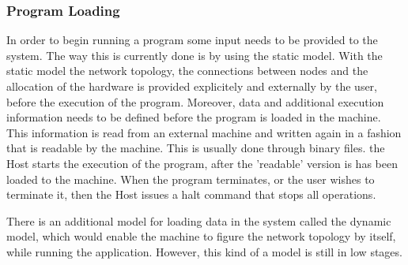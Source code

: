 \documentclass[12pt,a4paper]{article}
\begin{document}
\subsubsection{Program Loading}
In order to begin running a program some input needs to be provided to the system. The way this is currently done is by using the static model. With the static model the network topology, the connections between nodes and the allocation of the hardware is provided explicitely and externally by the user, before the execution of the program. Moreover, data and additional execution information needs to be defined before the program is loaded in the machine. This information is read from an external machine and written again in a fashion that is readable by the machine. This is usually done through binary files. the Host starts the execution of the program, after the 'readable' version is has been loaded to the machine. When the program terminates, or the user wishes to terminate it, then the Host issues a halt command that stops all operations\cite{docfile}.

There is an additional model for loading data in the system called the dynamic model, which would enable the machine to figure the network topology by itself, while running the application. However, this kind of a model is still in low stages\cite{docfile}.
\end{document}
